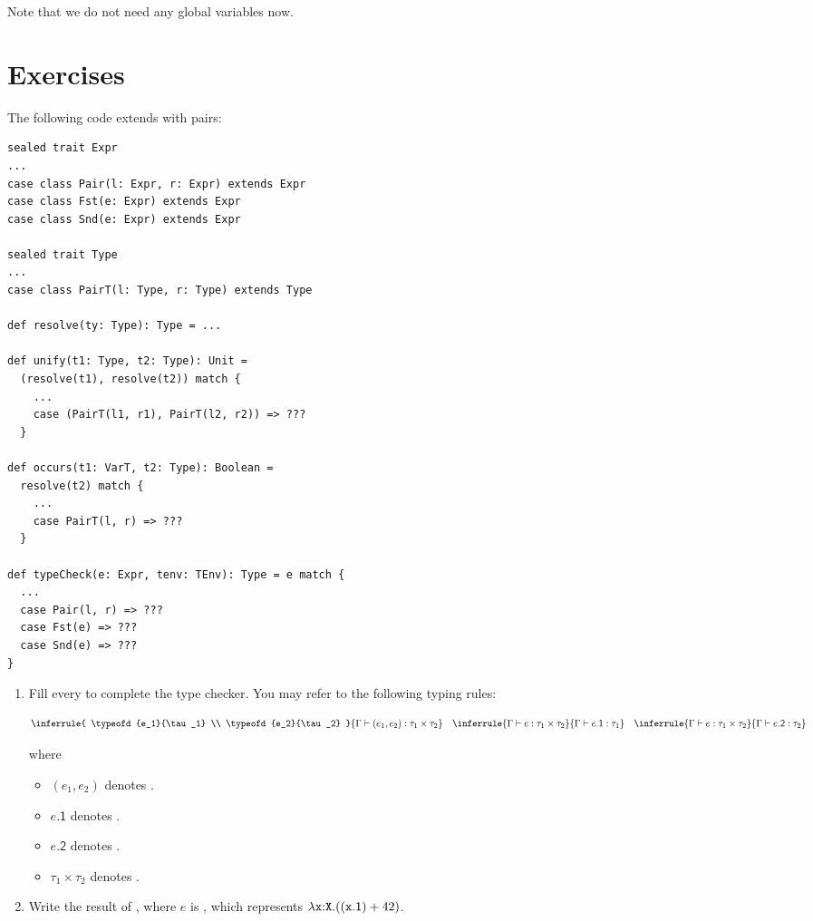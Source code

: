 Note that we do not need any global variables now.

\section{Exercises}

\begin{exercise}

\item The following code extends \lang with pairs:

\begin{verbatim}
sealed trait Expr
...
case class Pair(l: Expr, r: Expr) extends Expr
case class Fst(e: Expr) extends Expr
case class Snd(e: Expr) extends Expr

sealed trait Type
...
case class PairT(l: Type, r: Type) extends Type

def resolve(ty: Type): Type = ...

def unify(t1: Type, t2: Type): Unit =
  (resolve(t1), resolve(t2)) match {
    ...
    case (PairT(l1, r1), PairT(l2, r2)) => ???
  }

def occurs(t1: VarT, t2: Type): Boolean =
  resolve(t2) match {
    ...
    case PairT(l, r) => ???
  }

def typeCheck(e: Expr, tenv: TEnv): Type = e match {
  ...
  case Pair(l, r) => ???
  case Fst(e) => ???
  case Snd(e) => ???
}
\end{verbatim}

    \begin{enumerate}
        \item
Fill every  to complete the type checker.
You may refer to the following typing rules:

\[
\inferrule
{ \typeofd{e_1}{\tau_1} \\ \typeofd{e_2}{\tau_2} }
{ \typeofd{(e_1,e_2)}{\tau_1\times\tau_2} }
\quad
\inferrule
{ \typeofd{e}{\tau_1\times\tau_2} }
{ \typeofd{e\textsf{.1}}{\tau_1} }
\quad
\inferrule
{ \typeofd{e}{\tau_1\times\tau_2} }
{ \typeofd{e\textsf{.2}}{\tau_2} }
\]

where

        \begin{itemize}
        \item $(e_1,e_2)$ denotes .
        \item $e\textsf{.1}$ denotes .
        \item $e\textsf{.2}$ denotes .
        \item $\tau_1\times\tau_2$ denotes .
        \end{itemize}
  \item
    Write the result of , where $e$ is
    ,
    which represents
    $\lambda\texttt{x}{:}\texttt{X}.((\texttt{x}\textsf{.1})+42)$.
\end{enumerate}

\end{exercise}

